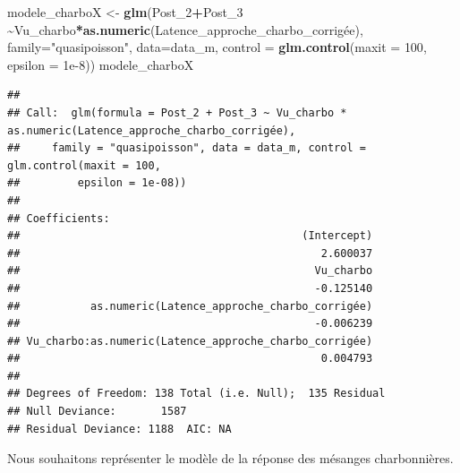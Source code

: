 \documentclass[
  french,
]{article}
\newenvironment{Shaded}{\begin{snugshade}}{\end{snugshade}}
\newcommand{\AttributeTok}[1]{\textcolor[rgb]{0.13,0.29,0.53}{#1}}
\newcommand{\DecValTok}[1]{\textcolor[rgb]{0.00,0.00,0.81}{#1}}
\newcommand{\FloatTok}[1]{\textcolor[rgb]{0.00,0.00,0.81}{#1}}
\newcommand{\FunctionTok}[1]{\textcolor[rgb]{0.13,0.29,0.53}{\textbf{#1}}}
\newcommand{\NormalTok}[1]{#1}
\newcommand{\OtherTok}[1]{\textcolor[rgb]{0.56,0.35,0.01}{#1}}
\newcommand{\SpecialCharTok}[1]{\textcolor[rgb]{0.81,0.36,0.00}{\textbf{#1}}}
\newcommand{\StringTok}[1]{\textcolor[rgb]{0.31,0.60,0.02}{#1}}
\begin{document}
\begin{Shaded}
\begin{Highlighting}[]
\NormalTok{modele\_charboX }\OtherTok{\textless{}{-}} \FunctionTok{glm}\NormalTok{(Post\_2}\SpecialCharTok{+}\NormalTok{Post\_3 }\SpecialCharTok{\textasciitilde{}}\NormalTok{Vu\_charbo}\SpecialCharTok{*}\FunctionTok{as.numeric}\NormalTok{(Latence\_approche\_charbo\_corrigée), }\AttributeTok{family=}\StringTok{"quasipoisson"}\NormalTok{, }\AttributeTok{data=}\NormalTok{data\_m, }
            \AttributeTok{control =} \FunctionTok{glm.control}\NormalTok{(}\AttributeTok{maxit =} \DecValTok{100}\NormalTok{, }\AttributeTok{epsilon =} \FloatTok{1e{-}8}\NormalTok{))}
\NormalTok{modele\_charboX}
\end{Highlighting}
\end{Shaded}

\begin{verbatim}
## 
## Call:  glm(formula = Post_2 + Post_3 ~ Vu_charbo * as.numeric(Latence_approche_charbo_corrigée), 
##     family = "quasipoisson", data = data_m, control = glm.control(maxit = 100, 
##         epsilon = 1e-08))
## 
## Coefficients:
##                                            (Intercept)  
##                                               2.600037  
##                                              Vu_charbo  
##                                              -0.125140  
##           as.numeric(Latence_approche_charbo_corrigée)  
##                                              -0.006239  
## Vu_charbo:as.numeric(Latence_approche_charbo_corrigée)  
##                                               0.004793  
## 
## Degrees of Freedom: 138 Total (i.e. Null);  135 Residual
## Null Deviance:       1587 
## Residual Deviance: 1188  AIC: NA
\end{verbatim}

Nous souhaitons représenter le modèle de la réponse des mésanges
charbonnières.
\end{document}

